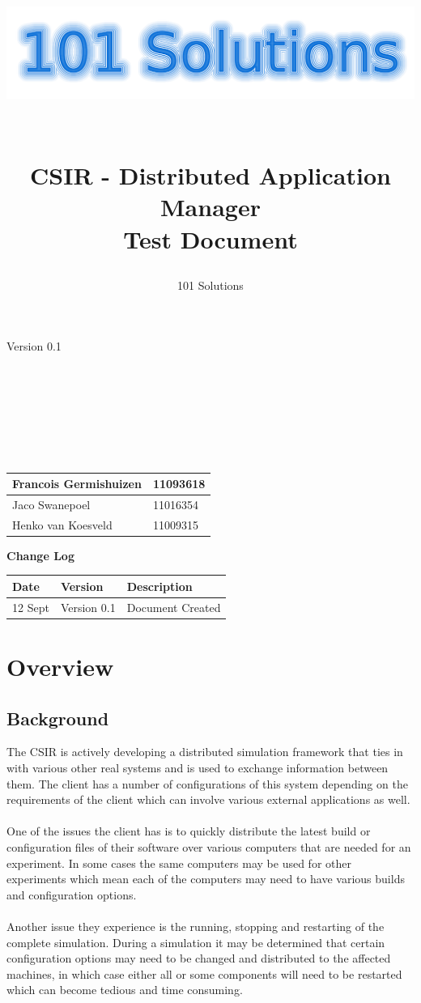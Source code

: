 \documentclass[a4paper,12pt,final]{article}
\title{
\begin{center}
  	\includegraphics[scale=0.3]{101Logo.png} 
  \end{center}
  \textbf{\\}
CSIR - Distributed Application Manager\\
Test Document\\
}
\author{101 Solutions}
\begin{document}
\maketitle
\begin{center}
Version 0.1
\end{center}
\textbf{\\}
\textbf{\\}
\textbf{\\}
\textbf{\\}
\textbf{\\}
\textbf{\\}
\begin{center}
\begin{tabular}{|l|l|}
\hline
Francois Germishuizen & 11093618\\
\hline
Jaco Swanepoel & 11016354\\
\hline
Henko van Koesveld & 11009315\\
\hline
\end{tabular}
\end{center}
\thispagestyle{empty}
\newpage
\thispagestyle{empty}
\textbf{\large{Change Log}}
\vspace{6pt}\newline
\begin{tabular}{|l|l|l|}
\hline
Date & Version & Description\\
\hline
12 Sept & Version 0.1 & Document Created\\
\hline
\end{tabular}
\newpage
\tableofcontents
\thispagestyle{empty}
\newpage

\section{Overview}
\subsection{Background}
The CSIR is actively developing a distributed simulation framework that ties
in with various other real systems and is used to exchange information
between them. The client has a number of configurations of this system
depending on the requirements of the client which can involve various
external applications as well.\\
\textbf{\\}
One of the issues the client has is to quickly distribute the latest build or
configuration files of their software over various computers that are needed
for an experiment. In some cases the same computers may be used for other
experiments which mean each of the computers may need to have various
builds and configuration options.\\
\textbf{\\}
Another issue they experience is the running, stopping and restarting of
the complete simulation. During a simulation it may be determined that
certain configuration options may need to be changed and distributed to the
affected machines, in which case either all or some components will need to
be restarted which can become tedious and time consuming.
\end{document}
